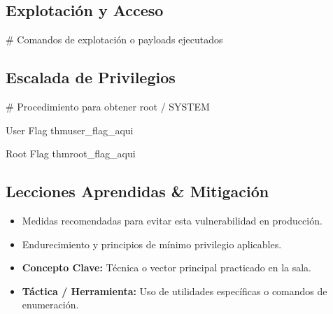 \documentclass[../../../main_compilation.tex]{subfiles}
\begin{document}
\subsection{Explotación y Acceso}

\begin{terminal}
	# Comandos de explotación o payloads ejecutados
\end{terminal}

\subsection{Escalada de Privilegios}

\begin{terminal}
	# Procedimiento para obtener root / SYSTEM
\end{terminal}

\begin{flagbox}{User Flag}
	thm{user_flag_aqui}
\end{flagbox}

\begin{flagbox}{Root Flag}
	thm{root_flag_aqui}
\end{flagbox}

\subsection{Lecciones Aprendidas \& Mitigación}

\begin{mitigationbox}
	\begin{itemize}[leftmargin=*]
		\item Medidas recomendadas para evitar esta vulnerabilidad en producción.
		\item Endurecimiento y principios de mínimo privilegio aplicables.
	\end{itemize}
\end{mitigationbox}

\begin{learningbox}
	\begin{itemize}[leftmargin=*]
		\item \textbf{Concepto Clave:} Técnica o vector principal practicado en la sala.
		\item \textbf{Táctica / Herramienta:} Uso de utilidades específicas o comandos de enumeración.
	\end{itemize}
\end{learningbox}

\begin{sourcebox}
	\begin{itemize}[leftmargin=*]
	\end{itemize}
\end{sourcebox}
\end{document}
